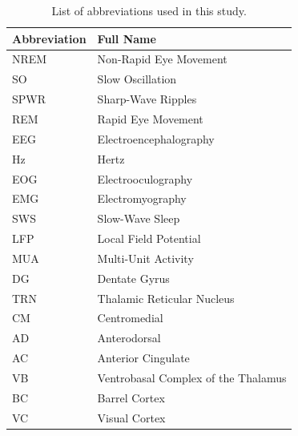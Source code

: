\documentclass[12pt]{report}
\begin{document}
\appendix

\begin{table}[H]
	\centering
	\caption{List of abbreviations used in this study.}
	\label{tab:abbreviations}
	
	\begin{tabular}{>{\centering\arraybackslash}p{3cm}
			>{\centering\arraybackslash}p{8cm}}
		\hline
		\textbf{Abbreviation} & \textbf{Full Name} \\
		\hline
		
		NREM & Non-Rapid Eye Movement \\
		SO & Slow Oscillation \\
		SPWR & Sharp-Wave Ripples \\
		REM & Rapid Eye Movement \\
		EEG & Electroencephalography \\
		Hz & Hertz \\
		EOG & Electrooculography \\
		EMG & Electromyography \\
		SWS & Slow-Wave Sleep \\
		LFP & Local Field Potential \\
		MUA & Multi-Unit Activity \\
		DG & Dentate Gyrus \\
		TRN & Thalamic Reticular Nucleus \\
		CM & Centromedial \\
		AD & Anterodorsal \\
		AC & Anterior Cingulate \\
		VB & Ventrobasal Complex of the Thalamus \\
		BC & Barrel Cortex \\
		VC & Visual Cortex \\
		
		\hline
	\end{tabular}
\end{table}




\end{document}
